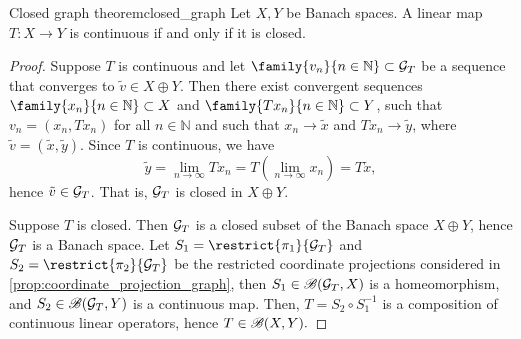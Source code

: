 \begin{theorem}{Closed graph theorem}{closed_graph}
    Let \(X, Y\) be Banach spaces. A linear map \(T : X \to Y\) is continuous if and only if it is closed.
\end{theorem}
\begin{proof}
    Suppose \(T\) is continuous and let \(\family{v_n}{n \in \mathbb{N}}\subset \graph{T}\) be a sequence that converges to \(\tilde{v} \in X \oplus Y\). Then there exist convergent sequences \(\family{x_n}{n \in \mathbb{N}} \subset X\) and \(\family{Tx_n}{n \in \mathbb{N}} \subset Y\), such that \(v_n = (x_n, Tx_n)\) for all \(n \in \mathbb{N}\) and such that \(x_n \to \tilde{x}\) and \(Tx_n \to \tilde{y}\), where \(\tilde{v} = (\tilde{x}, \tilde{y})\). Since \(T\) is continuous, we have
    \begin{equation*}
        \tilde{y} = \lim_{n\to\infty} Tx_n = T\left(\lim_{n\to\infty} x_n\right)= T\tilde{x},
    \end{equation*}
    hence \(\tilde{v} \in \mathcal{G}_{T}\). That is, \(\mathcal{G}_{T}\) is closed in \(X \oplus Y\).

    Suppose \(T\) is closed. Then \(\mathcal{G}_{T}\) is a closed subset of the Banach space \(X \oplus Y\), hence \(\mathcal{G}_{T}\) is a Banach space. Let \(S_1 = \restrict{\pi_1}{\graph{T}}\) and \(S_2 = \restrict{\pi_2}{\graph{T}}\) be the restricted coordinate projections considered in \cref{prop:coordinate_projection_graph}, then \(S_1 \in \mathscr{B}(\mathcal{G}_{T}, X)\) is a homeomorphism, and \(S_2 \in \mathscr{B}(\mathcal{G}_{T}, Y)\) is a continuous map. Then, \(T = S_2 \circ S_1^{-1}\) is a composition of continuous linear operators, hence \(T \in \mathscr{B}(X, Y).\)
\end{proof}

